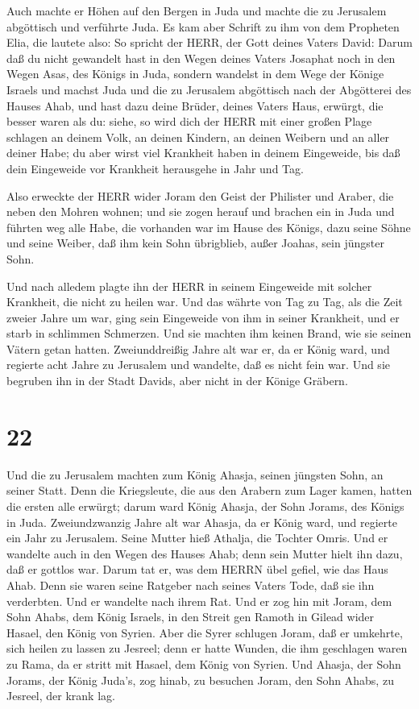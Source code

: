  Auch machte er Höhen auf den Bergen in Juda und machte die
zu Jerusalem abgöttisch und verführte Juda.  Es kam aber
Schrift zu ihm von dem Propheten Elia, die lautete also: So spricht der
HERR, der Gott deines Vaters David: Darum daß du nicht gewandelt hast in
den Wegen deines Vaters Josaphat noch in den Wegen Asas, des Königs in
Juda,  sondern wandelst in dem Wege der Könige Israels und
machst Juda und die zu Jerusalem abgöttisch nach der Abgötterei des
Hauses Ahab, und hast dazu deine Brüder, deines Vaters Haus, erwürgt,
die besser waren als du:  siehe, so wird dich der HERR mit
einer großen Plage schlagen an deinem Volk, an deinen Kindern, an deinen
Weibern und an aller deiner Habe;  du aber wirst viel
Krankheit haben in deinem Eingeweide, bis daß dein Eingeweide vor
Krankheit herausgehe in Jahr und Tag.

 Also erweckte der HERR wider Joram den Geist der Philister
und Araber, die neben den Mohren wohnen;  und sie zogen
herauf und brachen ein in Juda und führten weg alle Habe, die vorhanden
war im Hause des Königs, dazu seine Söhne und seine Weiber, daß ihm kein
Sohn übrigblieb, außer Joahas, sein jüngster Sohn.

 Und nach alledem plagte ihn der HERR in seinem Eingeweide
mit solcher Krankheit, die nicht zu heilen war.  Und das
währte von Tag zu Tag, als die Zeit zweier Jahre um war, ging sein
Eingeweide von ihm in seiner Krankheit, und er starb in schlimmen
Schmerzen. Und sie machten ihm keinen Brand, wie sie seinen Vätern getan
hatten.  Zweiunddreißig Jahre alt war er, da er König ward,
und regierte acht Jahre zu Jerusalem und wandelte, daß es nicht fein
war. Und sie begruben ihn in der Stadt Davids, aber nicht in der Könige
Gräbern.

\hypertarget{section-21}{%
\section{22}\label{section-21}}

 Und die zu Jerusalem machten zum König Ahasja, seinen
jüngsten Sohn, an seiner Statt. Denn die Kriegsleute, die aus den
Arabern zum Lager kamen, hatten die ersten alle erwürgt; darum ward
König Ahasja, der Sohn Jorams, des Königs in Juda. 
Zweiundzwanzig Jahre alt war Ahasja, da er König ward, und regierte ein
Jahr zu Jerusalem. Seine Mutter hieß Athalja, die Tochter Omris.
 Und er wandelte auch in den Wegen des Hauses Ahab; denn
sein Mutter hielt ihn dazu, daß er gottlos war.  Darum tat
er, was dem HERRN übel gefiel, wie das Haus Ahab. Denn sie waren seine
Ratgeber nach seines Vaters Tode, daß sie ihn verderbten. 
Und er wandelte nach ihrem Rat. Und er zog hin mit Joram, dem Sohn
Ahabs, dem König Israels, in den Streit gen Ramoth in Gilead wider
Hasael, den König von Syrien. Aber die Syrer schlugen Joram,
 daß er umkehrte, sich heilen zu lassen zu Jesreel; denn er
hatte Wunden, die ihm geschlagen waren zu Rama, da er stritt mit Hasael,
dem König von Syrien. Und Ahasja, der Sohn Jorams, der König Juda's, zog
hinab, zu besuchen Joram, den Sohn Ahabs, zu Jesreel, der krank lag.

